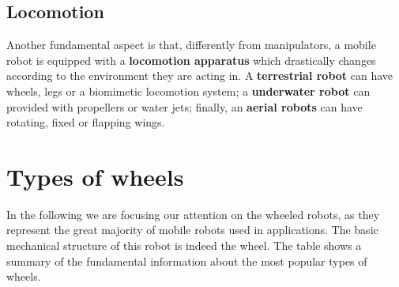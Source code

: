 \subsection{Locomotion}
Another fundamental aspect is that, differently from manipulators, a mobile robot is equipped with a \textbf{locomotion apparatus} which drastically changes according to the environment they are acting in. A \textbf{terrestrial robot} can have wheels, legs or a biomimetic locomotion system; a \textbf{underwater robot} can provided with propellers or water jets; finally, an \textbf{aerial robots} can have rotating, fixed or flapping wings.

\section{Types of wheels}
In the following we are focusing our attention on the wheeled robots, as they represent the great majority of mobile robots used in applications. The basic mechanical structure of this robot is indeed the wheel. The table  shows a summary of the fundamental information about the most popular types of wheels.

